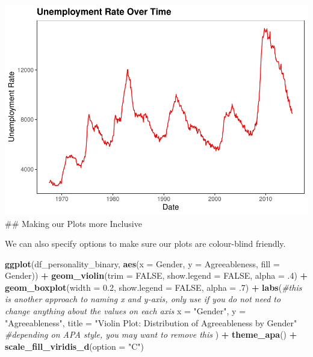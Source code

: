 \documentclass[
]{book}
\newenvironment{Shaded}{\begin{snugshade}}{\end{snugshade}}
\newcommand{\AttributeTok}[1]{\textcolor[rgb]{0.13,0.29,0.53}{#1}}
\newcommand{\CommentTok}[1]{\textcolor[rgb]{0.56,0.35,0.01}{\textit{#1}}}
\newcommand{\ConstantTok}[1]{\textcolor[rgb]{0.56,0.35,0.01}{#1}}
\newcommand{\DecValTok}[1]{\textcolor[rgb]{0.00,0.00,0.81}{#1}}
\newcommand{\FloatTok}[1]{\textcolor[rgb]{0.00,0.00,0.81}{#1}}
\newcommand{\FunctionTok}[1]{\textcolor[rgb]{0.13,0.29,0.53}{\textbf{#1}}}
\newcommand{\NormalTok}[1]{#1}
\newcommand{\SpecialCharTok}[1]{\textcolor[rgb]{0.81,0.36,0.00}{\textbf{#1}}}
\newcommand{\StringTok}[1]{\textcolor[rgb]{0.31,0.60,0.02}{#1}}
\begin{document}
\includegraphics{rintro_demo_files/figure-latex/unnamed-chunk-327-1.pdf}
\#\# Making our Plots more Inclusive

We can also specify options to make sure our plots are colour-blind friendly.

\begin{Shaded}
\begin{Highlighting}[]
\FunctionTok{ggplot}\NormalTok{(df\_personality\_binary, }\FunctionTok{aes}\NormalTok{(}\AttributeTok{x =}\NormalTok{ Gender, }\AttributeTok{y =}\NormalTok{ Agreeableness, }\AttributeTok{fill =}\NormalTok{ Gender)) }\SpecialCharTok{+}
  \FunctionTok{geom\_violin}\NormalTok{(}\AttributeTok{trim =} \ConstantTok{FALSE}\NormalTok{, }
              \AttributeTok{show.legend =} \ConstantTok{FALSE}\NormalTok{, }
              \AttributeTok{alpha =}\NormalTok{ .}\DecValTok{4}\NormalTok{) }\SpecialCharTok{+}
  \FunctionTok{geom\_boxplot}\NormalTok{(}\AttributeTok{width =} \FloatTok{0.2}\NormalTok{, }
               \AttributeTok{show.legend =} \ConstantTok{FALSE}\NormalTok{,}
               \AttributeTok{alpha =}\NormalTok{ .}\DecValTok{7}\NormalTok{) }\SpecialCharTok{+}
  \FunctionTok{labs}\NormalTok{(}\CommentTok{\#this is another approach to naming x and y{-}axis, only use if you do not need to change anything about the values on each axis}
    \AttributeTok{x =} \StringTok{"Gender"}\NormalTok{, }
    \AttributeTok{y =} \StringTok{"Agreeableness"}\NormalTok{,}
    \AttributeTok{title =} \StringTok{"Violin Plot: Distribution of Agreeableness by Gender"} \CommentTok{\#depending on APA style, you may want to remove this}
\NormalTok{  ) }\SpecialCharTok{+}
  \FunctionTok{theme\_apa}\NormalTok{() }\SpecialCharTok{+}
  \FunctionTok{scale\_fill\_viridis\_d}\NormalTok{(}\AttributeTok{option =} \StringTok{"C"}\NormalTok{)}
\end{Highlighting}
\end{Shaded}
\end{document}
